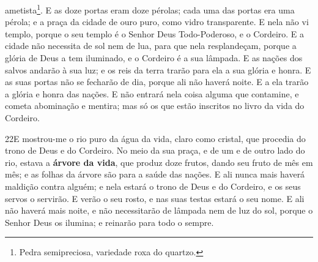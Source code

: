 ametista\footnote{Pedra semipreciosa, variedade roxa do quartzo.}.
E as doze portas eram doze pérolas; cada uma das portas era
uma pérola; e a praça da cidade de ouro puro, como vidro
transparente. E nela não vi templo, porque o seu templo é o
Senhor Deus Todo-Poderoso, e o Cordeiro. E a cidade não
necessita de sol nem de lua, para que nela resplandeçam, porque a
glória de Deus a tem iluminado, e o Cordeiro é a sua lâmpada.
E as nações dos salvos andarão à sua luz; e os reis da terra
trarão para ela a sua glória e honra. E as suas portas não se
fecharão de dia, porque ali não haverá noite. E a ela trarão
a glória e honra das nações. E não entrará nela coisa alguma
que contamine, e cometa abominação e mentira; mas só os que estão
inscritos no livro da vida do Cordeiro.

\medskip

\lettrine{22} E mostrou-me o rio puro da água da vida, claro
como cristal, que procedia do trono de Deus e do Cordeiro. No
meio da sua praça, e de um e de outro lado do rio, estava a
\textbf{árvore da vida}, que produz doze frutos, dando seu fruto de
mês em mês; e as folhas da árvore são para a saúde das nações. E
ali nunca mais haverá maldição contra alguém; e nela estará o trono
de Deus e do Cordeiro, e os seus servos o servirão. E verão o
seu rosto, e nas suas testas estará o seu nome. E ali não haverá
mais noite, e não necessitarão de lâmpada nem de luz do sol, porque
o Senhor Deus os ilumina; e reinarão para todo o sempre.

